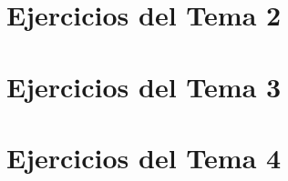 \documentclass[a4paper]{book}
\begin{document}
\chapter{Ejercicios del Tema 2}
\chapter{Ejercicios del Tema 3}
\chapter{Ejercicios del Tema 4}




% 
% 
\end{document}
